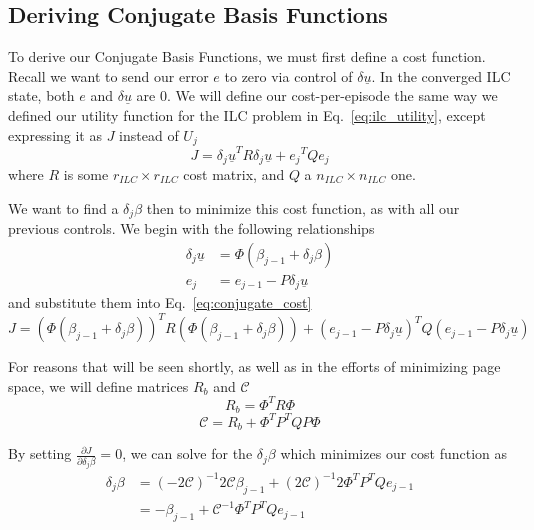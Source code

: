 \FloatBarrier\subsection{Deriving Conjugate Basis Functions}
To derive our Conjugate Basis Functions, we must first define a cost function. Recall we want to send our error $e$ to zero via control of $\delta\underline{u}$. In the converged ILC state, both $e$ and $\delta\underline{u}$ are 0. We will define our cost-per-episode the same way we defined our utility function for the ILC problem in Eq.~\ref{eq:ilc_utility}, except expressing it as $J$ instead of $U_j$
\begin{equation}
    J = {\delta_j \underline{u}}^T R {\delta_j \underline{u}} + {e_j}^T Q {e_j}
    \label{eq:conjugate_cost}
\end{equation}
where $R$ is some $r_{ILC} \times r_{ILC}$ cost matrix, and $Q$ a $n_{ILC} \times n_{ILC}$ one.

We want to find a $\delta_j \beta$ then to minimize this cost function, as with all our previous controls. We begin with the following relationships
\begin{equation}
    \begin{split}
        \delta_j \underline{u} &= \Phi(\beta_{j-1} + \delta_j \beta) \\
        e_j &= e_{j-1} - P \delta_j \underline{u}
    \end{split}
\end{equation}
and substitute them into Eq.~\ref{eq:conjugate_cost}
\begin{equation}
    J = {\left(\Phi(\beta_{j-1} + \delta_j \beta)\right)}^T R {\left(\Phi(\beta_{j-1} + \delta_j \beta)\right)} + {\left(e_{j-1} - P \delta_j \underline{u}\right)}^T Q {\left(e_{j-1} - P \delta_j \underline{u}\right)}
    \label{eq:conjugate_cost_in_beta}
\end{equation}

For reasons that will be seen shortly, as well as in the efforts of minimizing page space, we will define matrices $R_b$ and $\mathcal{C}$
\begin{equation}
    R_b = \Phi^T R \Phi
\end{equation}
\begin{equation}
    \mathcal{C} = R_b + \Phi^T P^T Q P \Phi
    \label{eq:conjuct_setup_matrix}
\end{equation}

By setting $\frac{\partial J}{\partial \delta_j \beta} = 0$, we can solve for the $\delta_j \beta$ which minimizes our cost function as
\begin{equation}
    \begin{split}
        \delta_j \beta &= {(-2\mathcal{C})}^{-1} {2\mathcal{C}}\beta_{j-1} + {(2\mathcal{C})}^{-1}2\Phi^T P^T Qe_{j-1} \\
        &=-\beta_{j-1} + {\mathcal{C}}^{-1}\Phi^T P^T Q e_{j-1}
    \end{split}
\end{equation}

